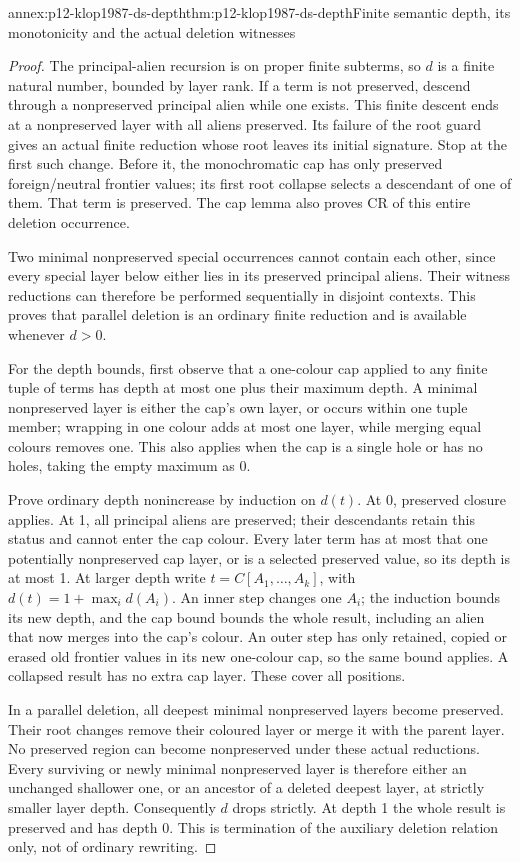 \begin{annexitem}{annex:p12-klop1987-ds-depth}{thm:p12-klop1987-ds-depth}{Finite semantic depth, its monotonicity and the actual deletion witnesses}
\begin{proof}
The principal-alien recursion is on proper finite subterms, so
\(d\) is a finite natural number, bounded by layer rank.
If a term is not preserved, descend through a nonpreserved principal
alien while one exists. This finite descent ends at a nonpreserved
layer with all aliens preserved. Its failure of the root guard gives
an actual finite reduction whose root leaves its initial signature.
Stop at the first such change. Before it, the monochromatic cap
has only preserved foreign/neutral frontier values; its first root
collapse selects a descendant of one of them. That term is preserved.
The cap lemma also proves CR of this entire deletion occurrence.

Two minimal nonpreserved special occurrences cannot contain each
other, since every special layer below either lies in its preserved
principal aliens. Their witness reductions can therefore be performed
sequentially in disjoint contexts. This proves that parallel deletion
is an ordinary finite reduction and is available whenever \(d>0\).

For the depth bounds, first observe that a one-colour cap applied
to any finite tuple of terms has depth at most one plus their
maximum depth. A minimal nonpreserved layer is either the cap's
own layer, or occurs within one tuple member; wrapping in one
colour adds at most one layer, while merging equal colours removes
one. This also applies when the cap is a single hole or has no
holes, taking the empty maximum as 0.

Prove ordinary depth nonincrease by induction on \(d(t)\).
At 0, preserved closure applies. At 1, all principal aliens are
preserved; their descendants retain this status and cannot enter
the cap colour. Every later term has at most that one potentially
nonpreserved cap layer, or is a selected preserved value, so its
depth is at most 1. At larger depth write
\(t=C[A_1,\ldots,A_k]\), with
\(d(t)=1+\max_i d(A_i)\). An inner step changes one \(A_i\);
the induction bounds its new depth, and the cap bound bounds the
whole result, including an alien that now merges into the cap's
colour. An outer step has only retained, copied or erased old
frontier values in its new one-colour cap, so the same bound applies.
A collapsed result has no extra cap layer. These cover all positions.

In a parallel deletion, all deepest minimal nonpreserved layers
become preserved. Their root changes remove their coloured layer
or merge it with the parent layer. No preserved region can become
nonpreserved under these actual reductions. Every surviving or
newly minimal nonpreserved layer is therefore either an unchanged
shallower one, or an ancestor of a deleted deepest layer, at strictly
smaller layer depth. Consequently \(d\) drops strictly. At depth 1
the whole result is preserved and has depth 0. This is termination
of the auxiliary deletion relation only, not of ordinary rewriting.
\end{proof}
\end{annexitem}

